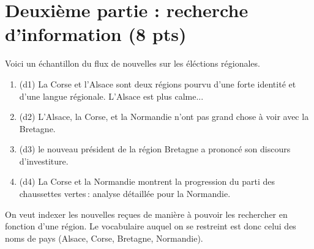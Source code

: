 \documentclass[11pt,a4paper]{article}
\newenvironment{solution}[0]{
~\\ \color{red} \textbf{Solution : }\color{black}}{%
}
\begin{document}

\section*{Deuxième partie : recherche d'information (8 pts)}


Voici un échantillon du flux de nouvelles sur les éléctions régionales. 

\begin{enumerate}
 \item (d1) La Corse et l'Alsace sont deux régions pourvu d'une forte identité
     et d'une langue régionale. L'Alsace est plus calme...
        \item (d2) L'Alsace, la Corse, et la Normandie n'ont pas grand chose à voir avec la Bretagne.
        \item (d3) le nouveau président de la région Bretagne
                a prononcé son discours d'investiture.
           \item (d4) La Corse et la Normandie montrent la progression du parti 
                 des chaussettes vertes\,: analyse détaillée pour la Normandie.
\end{enumerate}

On veut indexer les nouvelles reçues de manière à pouvoir les rechercher
en fonction d'une région. Le vocabulaire auquel on se restreint est donc celui
des noms de pays (Alsace, Corse, Bretagne, Normandie).

\smallskip
\end{document}
